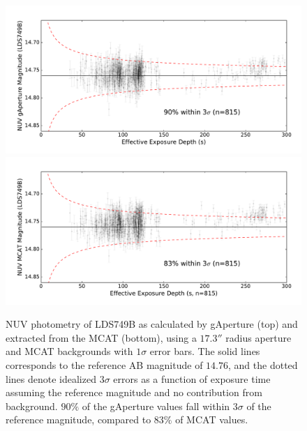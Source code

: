 \documentclass[iop]{emulateapj}
\begin{document}
\begin{figure}[h!]
\includegraphics[scale=0.3]{Fig06a.pdf}\\
\includegraphics[scale=0.3]{Fig06b.pdf}
\caption{NUV photometry of LDS749B as calculated by gAperture (top) and extracted from the MCAT (bottom), using a $17.3''$ radius aperture and MCAT backgrounds with $1\sigma$ error bars. The solid lines corresponds to the reference AB magnitude of $14.76$, and the dotted lines denote idealized $3\sigma$ errors as a function of exposure time assuming the reference magnitude and no contribution from background. $90\%$ of the gAperture values fall within $3\sigma$ of the reference magnitude, compared to $83\%$ of MCAT values.
\label{ldsabsphotnuv}}
\end{figure}
\end{document}

